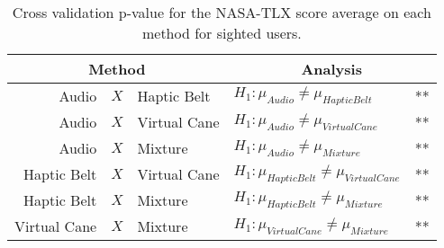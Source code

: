 
\begin{table}[!htb]
\centering
\caption{Cross validation p-value for the NASA-TLX score average on each method for sighted users.}
\label{tab:lsd_nasa_avg_two_way_sight}
\begin{tabular}{rcllr}
\toprule
      \multicolumn{3}{c}{Method} &                          \multicolumn{2}{c}{Analysis} \\
\midrule
       Audio & $X$ & Haptic Belt &        $H_1 : \mu_{Audio} \ne \mu_{Haptic Belt}$ & ** \\
      Audio & $X$ & Virtual Cane &       $H_1 : \mu_{Audio} \ne \mu_{Virtual Cane}$ & ** \\
           Audio & $X$ & Mixture &            $H_1 : \mu_{Audio} \ne \mu_{Mixture}$ & ** \\
Haptic Belt & $X$ & Virtual Cane & $H_1 : \mu_{Haptic Belt} \ne \mu_{Virtual Cane}$ & ** \\
     Haptic Belt & $X$ & Mixture &      $H_1 : \mu_{Haptic Belt} \ne \mu_{Mixture}$ & ** \\
    Virtual Cane & $X$ & Mixture &     $H_1 : \mu_{Virtual Cane} \ne \mu_{Mixture}$ & ** \\
\bottomrule
\end{tabular}
\end{table}

